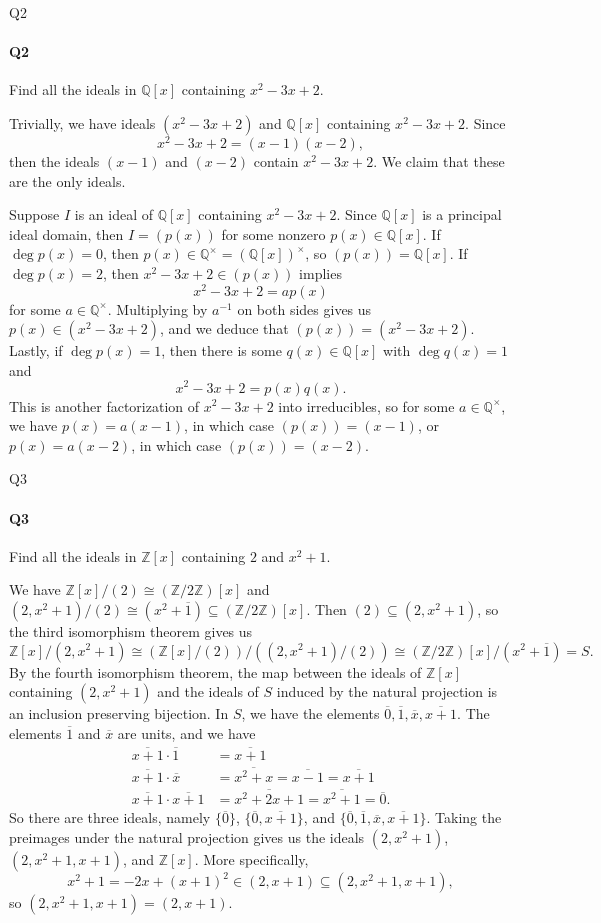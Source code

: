 \documentclass[12pt]{article}
\newenvironment{fullbox}{\begin{lrbox}{\savefullbox}\begin{minipage}{\dimexpr\textwidth-2\fboxsep\relax}}{\end{minipage}\end{lrbox}\begin{center}\framebox[\textwidth]{\usebox{\savefullbox}}\end{center}}
\newenvironment{pbox}[1][]{\begin{fullbox}\ifx#1\empty\else\paragraph{#1}\fi}{\end{fullbox}}
\theoremstyle{definition}
\newcommand{\Z}{\mathbb{Z}}
\newcommand{\Q}{\mathbb{Q}}
\newcommand{\isom}{\cong}
\newcommand{\eqc}{\overline}
\begin{document}
\newpage
\begin{pbox}[Q2]
    Find all the ideals in $\Q[x]$ containing $x^2 - 3x + 2$.
\end{pbox}

Trivially, we have ideals $(x^2 - 3x + 2)$ and $\Q[x]$ containing $x^2 - 3x + 2$. Since
\[
    x^2 - 3x + 2 = (x - 1)(x - 2),
\]
then the ideals $(x-1)$ and $(x-2)$ contain $x^2 - 3x +2$. We claim that these are the only ideals.

Suppose $I$ is an ideal of $\Q[x]$ containing $x^2 - 3x + 2$. Since $\Q[x]$ is a principal ideal domain, then $I = (p(x))$ for some nonzero $p(x) \in \Q[x]$. If $\deg p(x) = 0$, then $p(x) \in \Q^\times = (\Q[x])^\times$, so $(p(x)) = \Q[x]$. If $\deg p(x) = 2$, then $x^2 - 3x + 2 \in (p(x))$ implies
\[
    x^2 - 3x + 2 = ap(x)
\]
for some $a \in \Q^\times$. Multiplying by $a^{-1}$ on both sides gives us $p(x) \in (x^2 - 3x + 2)$, and we deduce that $(p(x)) = (x^2 - 3x + 2)$. Lastly, if $\deg p(x) = 1$, then there is some $q(x) \in \Q[x]$ with $\deg q(x) = 1$ and
\[
    x^2 - 3x + 2 = p(x)q(x).
\]
This is another factorization of $x^2 - 3x + 2$ into irreducibles, so for some $a \in \Q^\times$, we have $p(x) = a(x-1)$, in which case $(p(x)) = (x-1)$, or $p(x) = a(x-2)$, in which case $(p(x)) = (x-2)$.



\newpage
\begin{pbox}[Q3]
    Find all the ideals in $\Z[x]$ containing $2$ and $x^2 + 1$.
\end{pbox}

We have $\Z[x]/(2) \isom (\Z/2\Z)[x]$ and $(2, x^2 +1)/(2) \isom (x^2 + \eqc{1}) \subseteq (\Z/2\Z)[x]$. Then $(2) \subseteq (2, x^2 +1)$, so the third isomorphism theorem gives us
\[
    \Z[x]/(2, x^2+1) \isom (\Z[x]/(2))/((2, x^2+1)/(2)) \isom (\Z/2\Z)[x]/(x^2 + \eqc{1}) = S.
\]
By the fourth isomorphism theorem, the map between the ideals of $\Z[x]$ containing $(2, x^2 + 1)$ and the ideals of $S$ induced by the natural projection is an inclusion preserving bijection. In $S$, we have the elements $\eqc{0}, \eqc{1}, \eqc{x}, \eqc{x+1}$. The elements $\eqc{1}$ and $\eqc{x}$ are units, and we have
\begin{align*}
    \eqc{x+1} \cdot \eqc{1} &= \eqc{x+1} \\
    \eqc{x+1} \cdot \eqc{x} &= \eqc{x^2 + x} = \eqc{x - 1} = \eqc{x+1} \\
    \eqc{x+1} \cdot \eqc{x+1} &= \eqc{x^2 + 2x + 1} = \eqc{x^2 + 1} = \eqc{0}.
\end{align*}
So there are three ideals, namely $\{\eqc{0}\}$, $\{\eqc{0}, \eqc{x+1}\}$, and $\{\eqc{0}, \eqc{1}, \eqc{x}, \eqc{x+1}\}$. Taking the preimages under the natural projection gives us the ideals $(2, x^2+1)$, $(2, x^2 + 1, x+1)$, and $\Z[x]$. More specifically,
\[
    x^2 + 1 = -2x + (x+1)^2 \in (2, x+1) \subseteq (2, x^2 + 1, x+1),
\]
so $(2, x^2 + 1, x+1) = (2, x+1)$.
\end{document}
